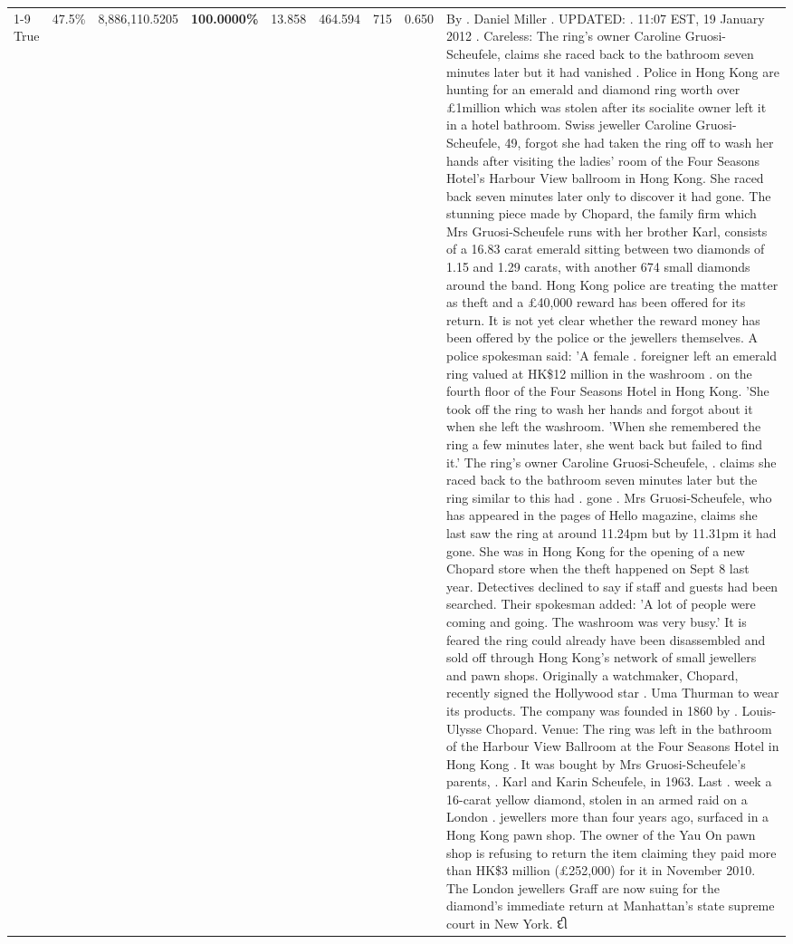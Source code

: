 \begin{table}[H]
\begin{tabular}{lllrlllll}
\cline{1-9}
True & 47.5\% & 8,886,110.5205 & \bfseries \color{red} 100.0000\% & 13.858 & 464.594 & 715 & 0.650 & By . Daniel Miller . UPDATED: . 11:07 EST, 19 January 2012 . Careless: The ring's owner Caroline Gruosi-Scheufele, claims she raced back to the bathroom seven minutes later but it had vanished . Police in Hong Kong are hunting for an emerald and diamond ring worth over £1million which was stolen after its socialite owner left it in a hotel bathroom. Swiss jeweller Caroline Gruosi-Scheufele, 49, forgot she had taken the ring off to wash her hands after visiting the ladies' room of the Four Seasons Hotel's Harbour View ballroom in Hong Kong. She raced back seven minutes later only to discover it had gone. The stunning piece made by Chopard, the family firm which Mrs Gruosi-Scheufele runs with her brother Karl, consists of a 16.83 carat emerald sitting between two diamonds of 1.15 and 1.29 carats, with another 674 small diamonds around the band. Hong Kong police are treating the matter as theft and a £40,000 reward has been offered for its return. It is not yet clear whether the reward money has been offered by the police or the jewellers themselves. A police spokesman said: 'A female . foreigner left an emerald ring valued at HK\$12 million in the washroom . on the fourth floor of the Four Seasons Hotel in Hong Kong. 'She took off the ring to wash her hands and forgot about it when she left the washroom. 'When she remembered the ring a few minutes later, she went back but failed to find it.' The ring's owner Caroline Gruosi-Scheufele, . claims she raced back to the bathroom seven minutes later but the ring similar to this had . gone . Mrs Gruosi-Scheufele, who has appeared in the pages of Hello magazine, claims she last saw the ring at around 11.24pm but by 11.31pm it had gone. She was in Hong Kong for the opening of a new Chopard store when the theft happened on Sept 8 last year. Detectives declined to say if staff and guests had been searched. Their spokesman added: 'A lot of people were coming and going. The washroom was very busy.' It is feared the ring could already have been disassembled and sold off through Hong Kong's network of small jewellers and pawn shops. Originally a watchmaker, Chopard, recently signed the Hollywood star . Uma Thurman to wear its products. The company was founded in 1860 by . Louis-Ulysse Chopard. Venue: The ring was left in the bathroom of the Harbour View Ballroom at the Four Seasons Hotel in Hong Kong . It was bought by Mrs Gruosi-Scheufele's  parents, . Karl and Karin Scheufele, in 1963. Last . week a 16-carat yellow diamond, stolen in an armed raid on a London . jewellers more than four years ago, surfaced in a Hong Kong pawn shop. The owner of the Yau On pawn shop is refusing to return the item claiming they paid more than HK\$3 million (£252,000) for it in November 2010. The London jewellers Graff are now suing for the diamond’s immediate return at Manhattan’s state supreme court in New York. દી \\

\end{tabular}
\end{table}
